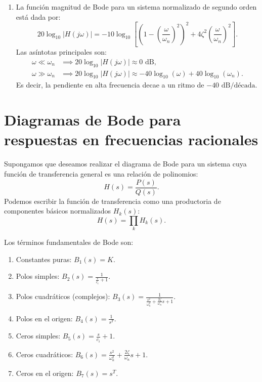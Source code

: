 \documentclass[11pt,a4paper,openany]{book}
\begin{document}
\begin{enumerate}
\begin{enumerate}
		\item En el caso $\zeta = 1$ (Sistema Cr\'{i}ticamente Amortiguado): $c_{1} = c_{2} = -\omega_{n}$. La respuesta al impulso es:
		\begin{equation}
			h_{1}(t) = \omega_{n}^{2} t e^{-\omega_{n} t} u(t).
		\end{equation}
	\end{enumerate}
	
	\item La funci\'{o}n magnitud de Bode para un sistema normalizado de segundo orden est\'{a} dada por:
	\begin{equation}
		20\log_{10} |H(j\omega)| = -10\log_{10} \left[ \left(1 - \left(\frac{\omega}{\omega_{n}}\right)^{2}\right)^{2} + 4\zeta^{2} \left(\frac{\omega}{\omega_{n}}\right)^{2} \right].
	\end{equation}
	Las as\'{i}ntotas principales son:
	\begin{align}
		\omega \ll \omega_{n} &\implies 20\log_{10} |H(j\omega)| \approx 0 \text{ dB}, \\
		\omega \gg \omega_{n} &\implies 20\log_{10} |H(j\omega)| \approx -40\log_{10}(\omega) + 40\log_{10}(\omega_{n}).
	\end{align}
	Es decir, la pendiente en alta frecuencia decae a un ritmo de $-40 \text{ dB/d\'{e}cada}$.
\end{enumerate}

\section{Diagramas de Bode para respuestas en frecuencias racionales}

Supongamos que deseamos realizar el diagrama de Bode para un sistema cuya funci\'{o}n de transferencia general es una relaci\'{o}n de polinomios:
\begin{equation}
	H(s) = \frac{P(s)}{Q(s)}.
\end{equation}
Podemos escribir la funci\'{o}n de transferencia como una productoria de componentes b\'{a}sicos normalizados $H_{k}(s)$:
\begin{equation}
	H(s) = \prod_{k} H_{k}(s).
\end{equation}

Los t\'{e}rminos fundamentales de Bode son:
\begin{enumerate}
	\item Constantes puras: $B_{1}(s) = K$.
	\item Polos simples: $B_{2}(s) = \frac{1}{\frac{s}{c_i} + 1}$.
	\item Polos cuadr\'{a}ticos (complejos): $B_{3}(s) = \frac{1}{\frac{s^2}{\omega_n^2} + \frac{2\zeta}{\omega_n} s + 1}$.
	\item Polos en el origen: $B_{4}(s) = \frac{1}{s^{T}}$.
	\item Ceros simples: $B_{5}(s) = \frac{s}{c_i} + 1$.
	\item Ceros cuadr\'{a}ticos: $B_{6}(s) = \frac{s^2}{\omega_n^2} + \frac{2\zeta}{\omega_n} s + 1$.
	\item Ceros en el origen: $B_{7}(s) = s^{T}$.
\end{enumerate}
\end{document}
